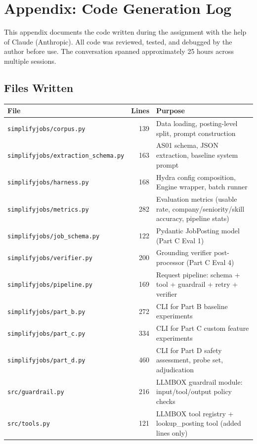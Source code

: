 \documentclass[11pt]{article}
\begin{document}
\clearpage
\appendix
\section{Appendix: Code Generation Log}

This appendix documents the code written during the assignment with the help of Claude (Anthropic). All code was reviewed, tested, and debugged by the author before use. The conversation spanned approximately 25 hours across multiple sessions.

\subsection{Files Written}

\begin{table}[H]
\centering
\small
\begin{tabularx}{\textwidth}{l r X}
\toprule
\textbf{File} & \textbf{Lines} & \textbf{Purpose} \\
\midrule
\texttt{simplifyjobs/corpus.py} & 139 & Data loading, posting-level split, prompt construction \\
\texttt{simplifyjobs/extraction\_schema.py} & 163 & AS01 schema, JSON extraction, baseline system prompt \\
\texttt{simplifyjobs/harness.py} & 168 & Hydra config composition, Engine wrapper, batch runner \\
\texttt{simplifyjobs/metrics.py} & 282 & Evaluation metrics (usable rate, company/seniority/skill accuracy, pipeline stats) \\
\texttt{simplifyjobs/job\_schema.py} & 122 & Pydantic JobPosting model (Part C Eval 1) \\
\texttt{simplifyjobs/verifier.py} & 200 & Grounding verifier post-processor (Part C Eval 4) \\
\texttt{simplifyjobs/pipeline.py} & 169 & Request pipeline: schema + tool + guardrail + retry + verifier \\
\texttt{simplifyjobs/part\_b.py} & 272 & CLI for Part B baseline experiments \\
\texttt{simplifyjobs/part\_c.py} & 334 & CLI for Part C custom feature experiments \\
\texttt{simplifyjobs/part\_d.py} & 460 & CLI for Part D safety assessment, probe set, adjudication \\
\texttt{src/guardrail.py} & 216 & LLMBOX guardrail module: input/tool/output policy checks \\
\texttt{src/tools.py} & 121 & LLMBOX tool registry + lookup\_posting tool (added lines only) \\
\bottomrule
\end{tabularx}
\end{table}
\end{document}
